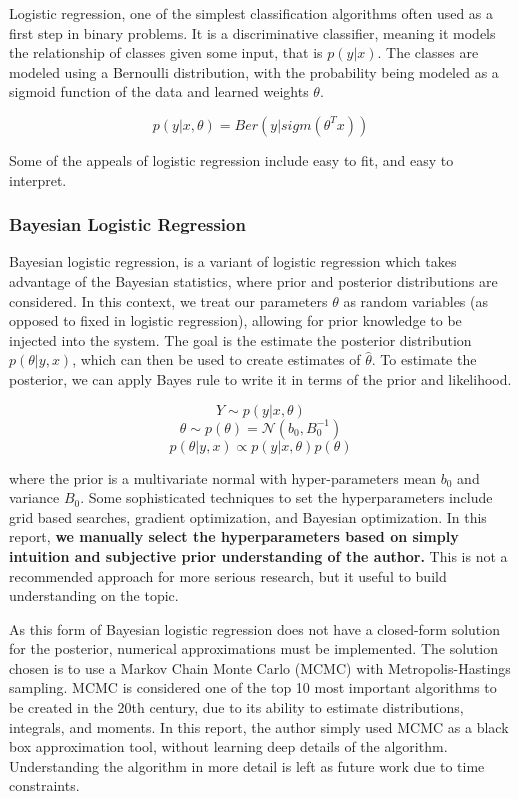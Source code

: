 \documentclass[10pt]{article}
\begin{document}
Logistic regression, one of the simplest classification algorithms often used as a first step in binary problems. It is a discriminative classifier, meaning it models the relationship of classes given some input, that is $p(y | x)$. The classes are modeled using a Bernoulli distribution, with the probability being modeled as a sigmoid function of the data and learned weights $\theta$. 

$$p(y| x, \theta) = Ber(y | sigm(\theta^T x))$$

Some of the appeals of logistic regression include easy to fit, and easy to interpret.

\subsubsection{Bayesian Logistic Regression}

Bayesian logistic regression, is a variant of logistic regression which takes advantage of the Bayesian statistics, where prior and posterior distributions are considered. In this context, we treat our parameters $\theta$ as random variables (as opposed to fixed in logistic regression), allowing for prior knowledge to be injected into the system. The goal is the estimate the posterior distribution $p(\theta | y, x)$, which can then be used to create estimates of $\hat{\theta}$. To estimate the posterior, we can apply Bayes rule to write it in terms of the prior and likelihood.

$$Y \sim p(y | x, \theta)$$
$$\theta \sim p(\theta) = \mathcal{N}(b_0, B_0^{-1})$$
$$p(\theta | y, x) \propto p(y | x, \theta)p(\theta)$$ 

where the prior is a multivariate normal with hyper-parameters mean $b_0$ and variance $B_0$. Some sophisticated techniques to set the hyperparameters include grid based searches, gradient optimization, and Bayesian optimization. In this report, \textbf{we manually select the hyperparameters based on simply intuition and subjective prior understanding of the author.} This is not a recommended approach for more serious research, but it useful to build understanding on the topic. 

As this form of Bayesian logistic regression does not have a closed-form solution for the posterior, numerical approximations must be implemented. The solution chosen is to use a Markov Chain Monte Carlo (MCMC) with Metropolis-Hastings sampling. MCMC is considered one of the top 10 most important algorithms to be created in the 20th century, due to its ability to estimate distributions, integrals, and moments. In this report, the author simply used MCMC as a black box approximation tool, without learning deep details of the algorithm. Understanding the algorithm in more detail is left as future work due to time constraints.
\end{document}

